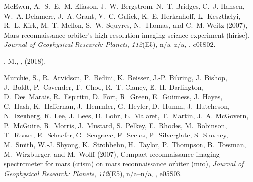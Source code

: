 \begin{thebibliography}{22}
McEwen, A.~S., E.~M. Eliason, J.~W. Bergstrom, N.~T. Bridges, C.~J. Hansen,
  W.~A. Delamere, J.~A. Grant, V.~C. Gulick, K.~E. Herkenhoff, L.~Keszthelyi,
  R.~L. Kirk, M.~T. Mellon, S.~W. Squyres, N.~Thomas, and C.~M. Weitz (2007),
  Mars reconnaissance orbiter's high resolution imaging science experiment
  (hirise), \textit{Journal of Geophysical Research: Planets},
  \textit{112}(E5), n/a--n/a, , e05S02.

\DIFdelbegin %
\DIFdelend \DIFaddbegin {}
, M., \DIFaddbegin {}, \DIFdelbegin {}\DIFdelend \DIFaddbegin {}\DIFaddbegin {}\DIFaddend (2018)\DIFaddbegin {}\DIFadd{, }\textit{}\DIFaddend .

Murchie, S., R.~Arvidson, P.~Bedini, K.~Beisser, J.-P. Bibring, J.~Bishop,
  J.~Boldt, P.~Cavender, T.~Choo, R.~T. Clancy, E.~H. Darlington,
  D.~Des~Marais, R.~Espiritu, D.~Fort, R.~Green, E.~Guinness, J.~Hayes,
  C.~Hash, K.~Heffernan, J.~Hemmler, G.~Heyler, D.~Humm, J.~Hutcheson,
  N.~Izenberg, R.~Lee, J.~Lees, D.~Lohr, E.~Malaret, T.~Martin, J.~A. McGovern,
  P.~McGuire, R.~Morris, J.~Mustard, S.~Pelkey, E.~Rhodes, M.~Robinson,
  T.~Roush, E.~Schaefer, G.~Seagrave, F.~Seelos, P.~Silverglate, S.~Slavney,
  M.~Smith, W.-J. Shyong, K.~Strohbehn, H.~Taylor, P.~Thompson, B.~Tossman,
  M.~Wirzburger, and M.~Wolff (2007), Compact reconnaissance imaging
  spectrometer for mars (crism) on mars reconnaissance orbiter (mro),
  \textit{Journal of Geophysical Research: Planets}, \textit{112}(E5),
  n/a--n/a, , e05S03.


\end{thebibliography}

